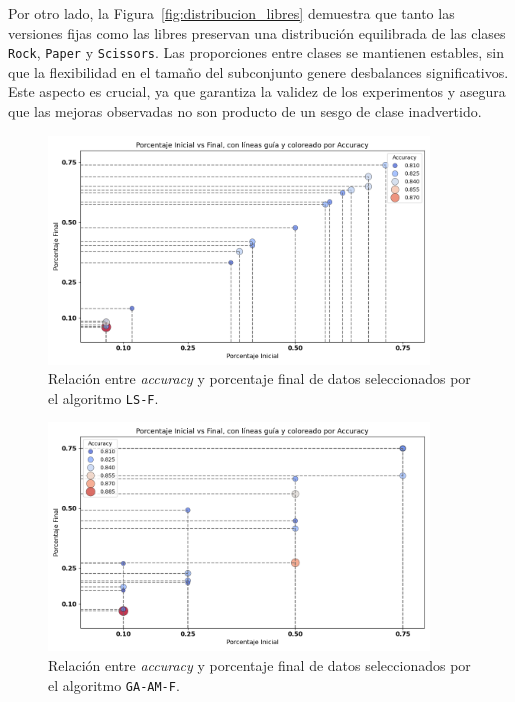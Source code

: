 Por otro lado, la Figura~\ref{fig:distribucion_libres} demuestra que tanto las versiones fijas como las libres preservan una
distribución equilibrada de las clases \texttt{Rock}, \texttt{Paper} y \texttt{Scissors}.
Las proporciones entre clases se mantienen estables, sin que la flexibilidad en el tamaño del subconjunto genere desbalances significativos.
Este aspecto es crucial, ya que garantiza la validez de los experimentos y asegura que las mejoras observadas no son producto de un sesgo de clase inadvertido.


\begin{figure}[htp]
    \centering
    \includegraphics[width=0.9\textwidth]{imagenes/evaluaciones/libres/scatter_ls-f.png}
    \caption{Relación entre \textit{accuracy} y porcentaje final de datos seleccionados por el algoritmo \texttt{LS-F}.}
    \label{fig:scatter_bl_f}
\end{figure}

\begin{figure}[htp]
    \centering
    \includegraphics[width=0.9\textwidth]{imagenes/evaluaciones/libres/scatter_ga-am-f.png}
    \caption{Relación entre \textit{accuracy} y porcentaje final de datos seleccionados por el algoritmo \texttt{GA-AM-F}.}
    \label{fig:scatter_gen_v2}
\end{figure}

